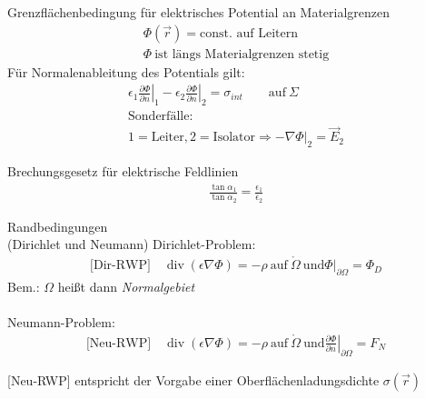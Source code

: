 \documentclass[a6paper]{kartei}
\begin{document}
\begin{karte}{Grenzflächenbedingung für elektrisches Potential an Materialgrenzen}
\begin{eqnarray*}
 \Phi(\vec{r}) = \text{const. auf Leitern} \\
 \Phi \ \text{ist längs Materialgrenzen stetig}
\end{eqnarray*}
Für Normalenableitung des Potentials gilt:
 \begin{eqnarray*}
  \left. \epsilon_{1} \frac{\partial \Phi}{\partial n} \right|_{1} - \left. \epsilon_{2} \frac{\partial \Phi}{\partial n} \right|_{2} =
  \sigma_{int} \qquad \text{auf} \ \Sigma \\
  \text{Sonderfälle:} \nonumber \\
  1 = \text{Leiter}, 2 = \text{Isolator} \Rightarrow \left. -\nabla \Phi \right|_{2} = \vec{E}_{2} %
 \end{eqnarray*}
\end{karte}

\begin{karte}{Brechungsgesetz für elektrische Feldlinien}
\begin{eqnarray*}
\frac{\operatorname{tan} \alpha_{1}}{\operatorname{tan} \alpha_{2}} = \frac{\epsilon_{1}}{\epsilon_{2}}
\end{eqnarray*}
\end{karte}


\begin{karte}{Randbedingungen\\(Dirichlet und Neumann)}
Dirichlet-Problem:
\begin{eqnarray*}
  \text{[Dir-RWP]} \quad \operatorname{div}(\epsilon \nabla \Phi) = - \rho \ \text{auf} \ \mathring{\Omega}
   \ \text{und} \left. \Phi\right|_{\partial \Omega} = \Phi_{D}
 \end{eqnarray*}
 Bem.: $\Omega$ heißt dann \emph{Normalgebiet}
\\\ \\Neumann-Problem:
\begin{eqnarray*}
 \text{[Neu-RWP]} \quad \operatorname{div}(\epsilon \nabla \Phi) = - \rho \ \text{auf} \ \mathring{\Omega}
   \ \text{und} \left. \frac{\partial \Phi}{\partial n}\right|_{\partial \Omega} = F_{N}
\end{eqnarray*}

[Neu-RWP] entspricht der Vorgabe einer Oberflächenladungsdichte $\sigma(\vec{r})$

\end{karte}
\end{document}
